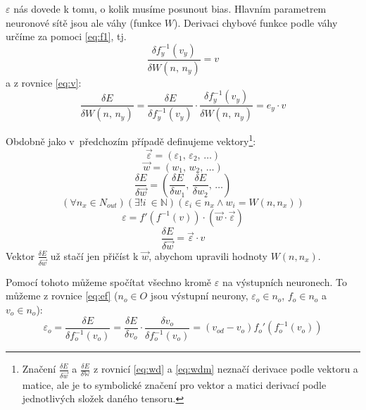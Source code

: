 \documentclass[12pt]{report}			%
\newcommand{\N}{\mathbb{N}}   			%
\newcommand{\W}{\mathbb{W}}
\begin{document}
					$\varepsilon$ nás dovede k tomu, o kolik musíme posunout bias. Hlavním parametrem neuronové sítě jsou ale váhy (funkce $W$). Derivaci chybové funkce podle váhy určíme za pomoci \ref{eq:f1}, tj.
					\begin{equation} \frac{\delta f_y^{-1}(v_y)}{\delta W\left(n,\,n_y\right)} = v \end{equation}
					a z rovnice \ref{eq:v}:
					\begin{equation} \frac{\delta E}{\delta W\left(n,\,n_y\right)} = \frac{\delta E}{\delta f_y^{-1}\left(v_y\right)}\cdot\frac{\delta f_y^{-1}\left(v_y\right)}{\delta W\left(n,\,n_y\right)} = e_y \cdot v \end{equation}
				
					Obdobně jako v~předchozím případě definujeme vektory\footnote{Značení $\frac{\delta E}{\delta\vec{w}}$ a $\frac{\delta E}{\delta\W}$ z rovnicí \ref{eq:wd} a \ref{eq:wdm} neznačí derivace podle vektoru a matice, ale je to symbolické značení pro vektor a matici derivací podle jednotlivých složek daného tensoru.}:
					\begin{equation} \vec{\varepsilon} = \left(\varepsilon_{1},\,\varepsilon_{2},\,\ldots\right) \end{equation}
					\begin{equation} \vec{w} = \left(w_{1},\,w_{2},\,\ldots\right) \end{equation}
					\begin{equation} \frac{\delta E}{\delta\vec{w}} = \left(\frac{\delta E}{\delta w_{1}},\,\frac{\delta E}{\delta w_{2}},\,\ldots\right) \label{eq:wd} \end{equation}
					\begin{equation} \left(\forall n_x \in N_{out}\right)\left(\exists! i~\in \N\right)\left(\varepsilon_i \in n_x \land w_i = W\left(n, n_x\right)\right) \end{equation}
					\begin{equation} \varepsilon = f'\left(f^{-1}(v)\right)\cdot \left(\vec{w} \cdot \vec{\varepsilon}\right) \label{eq:bp1} \end{equation}
					\begin{equation} \frac{\delta E}{\delta\vec{w}} = \vec{\varepsilon}\cdot v \label{eq:bp2} \end{equation}
					Vektor $\frac{\delta E}{\delta\vec{w}}$ už stačí jen přičíst k $\vec{w}$, abychom upravili hodnoty $W\left(n, n_x\right)$.
					
					Pomocí tohoto můžeme spočítat všechno kromě $\varepsilon$ na výstupních neuronech. To můžeme z rovnice \ref{eq:ef} ($n_o \in O$ jsou výstupní neurony, $\varepsilon_o \in n_o$, $f_o \in n_o$ a $v_o \in n_o$):
					\begin{equation} \varepsilon_o = \frac{\delta E}{\delta f_o^{-1}\left(v_o\right)} = \frac{\delta E}{\delta v_o} \cdot \frac{\delta v_o}{\delta f_o^{-1}\left(v_o\right)} = (v_{od} - v_o) f_o'\left(f_o^{-1}\left(v_o\right)\right) \label{eq:bpout} \end{equation}
					
\end{document}
